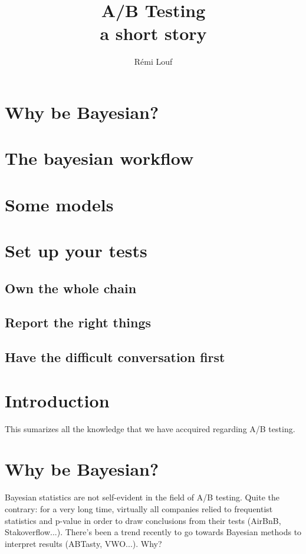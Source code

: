 \documentclass{tufte-book}
\title{A/B Testing\\a short story}
\author[]{R\'emi Louf}
\begin{document}
\maketitle

\tableofcontents

\chapter{Why be Bayesian?}

\chapter{The bayesian workflow}

\chapter{Some models}

\chapter{Set up your tests}

  \section{Own the whole chain}
  \section{Report the right things}
  \section{Have the difficult conversation first}

\cleardoublepage
\chapter*{Introduction}

This sumarizes all the knowledge that we have accquired regarding A/B testing.

\chapter{Why be Bayesian?}
\label{chap:why_bayes}

Bayesian statistics are not self-evident in the field of A/B testing. Quite the contrary: for a very long
time, virtually all companies relied to frequentist statistics and p-value in order to draw conclusions from
their tests (AirBnB, Stakoverflow...). There's been a trend recently to go towards Bayesian methods to
interpret results (ABTasty, VWO...). Why?
\end{document}
